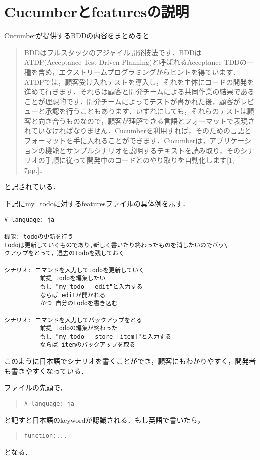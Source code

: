 \section{Cucumberとfeaturesの説明}
Cucumberが提供するBDDの内容をまとめると

\begin{quotation}
BDDはフルスタックのアジャイル開発技法です．BDDはATDP(Acceptance Test-Driven Planning)と呼ばれるAcceptance TDDの一種を含め，エクストリームプログラミングからヒントを得ています．ATDPでは，顧客受け入れテストを導入し，それを主体にコードの開発を進めて行きます．それらは顧客と開発チームによる共同作業の結果であることが理想的です．開発チームによってテストが書かれた後，顧客がレビューと承認を行うこともあります．いずれにしても，それらのテストは顧客と向き合うものなので，顧客が理解できる言語とフォーマットで表現されていなければなりません．Cucumberを利用すれば，そのための言語とフォーマットを手に入れることができます．Cucumberは，アプリケーションの機能とサンプルシナリオを説明するテキストを読み取り，そのシナリオの手順に従って開発中のコードとのやり取りを自動化します[1, 7pp.]．

\end{quotation}
と記されている．

下記にmy\_todoに対するfeaturesファイルの具体例を示す．
\begin{lstlisting}[style=customRuby]
# language: ja

機能: todoの更新を行う
todoは更新していくものであり,新しく書いたり終わったものを消したいのでバッ\
クアップをとって，過去のtodoを残しておく

シナリオ: コマンドを入力してtodoを更新していく
          前提 todoを編集したい
          もし "my_todo --edit"と入力する
          ならば editが開かれる
          かつ 自分のtodoを書き込む

シナリオ: コマンドを入力してバックアップをとる
          前提 todoの編集が終わった
          もし "my_todo --store [item]"と入力する
          ならば itemのバックアップを取る
\end{lstlisting}
このように日本語でシナリオを書くことができ，顧客にもわかりやすく，開発者も書きやすくなっている．

ファイルの先頭で，
\begin{quote}\begin{verbatim}
# language: ja
\end{verbatim}\end{quote}
と記すと日本語のkeywordが認識される．もし英語で書いたら，
\begin{quote}\begin{verbatim}
function:...

\end{verbatim}\end{quote}
となる．

